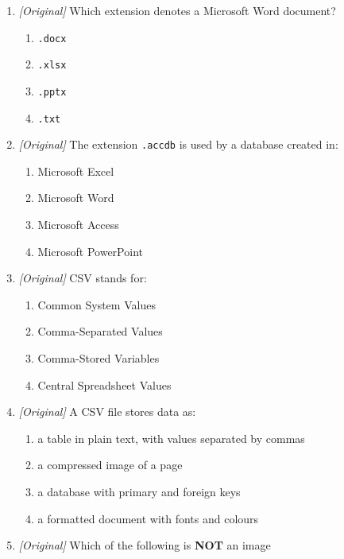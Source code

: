\documentclass[11pt]{article}
\begin{document}
\begin{enumerate}[label=\textbf{Q\arabic*.}, leftmargin=*]
  workbook?
  \begin{enumerate}[label=\Alph*.]
    \item \texttt{.docx}
    \item \texttt{.xlsx}
    \item \texttt{.pptx}
    \item \texttt{.accdb}
  \end{enumerate}
\item \textit{[Original]} Which extension denotes a Microsoft Word document?
  \begin{enumerate}[label=\Alph*.]
    \item \texttt{.docx}
    \item \texttt{.xlsx}
    \item \texttt{.pptx}
    \item \texttt{.txt}
  \end{enumerate}
\item \textit{[Original]} The extension \texttt{.accdb} is used by a database
  created in:
  \begin{enumerate}[label=\Alph*.]
    \item Microsoft Excel
    \item Microsoft Word
    \item Microsoft Access
    \item Microsoft PowerPoint
  \end{enumerate}
\item \textit{[Original]} CSV stands for:
  \begin{enumerate}[label=\Alph*.]
    \item Common System Values
    \item Comma-Separated Values
    \item Comma-Stored Variables
    \item Central Spreadsheet Values
  \end{enumerate}
\item \textit{[Original]} A CSV file stores data as:
  \begin{enumerate}[label=\Alph*.]
    \item a table in plain text, with values separated by commas
    \item a compressed image of a page
    \item a database with primary and foreign keys
    \item a formatted document with fonts and colours
  \end{enumerate}
\item \textit{[Original]} Which of the following is \textbf{NOT} an image

\end{enumerate}
\end{document}
